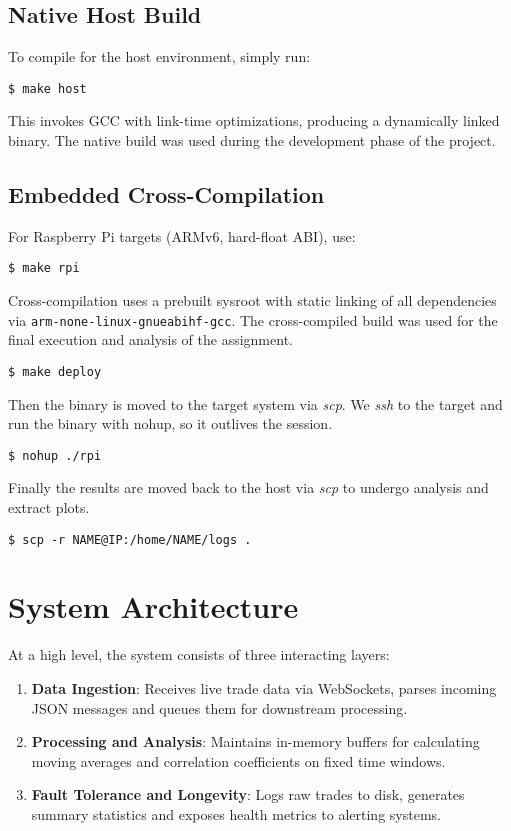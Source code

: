 \documentclass{article}
\begin{document}
\subsection{Native Host Build}
To compile for the host environment, simply run:
\begin{verbatim}
$ make host
\end{verbatim}
This invokes GCC with link-time optimizations, producing a dynamically linked binary. The native build was used during the development phase of the project.

\subsection{Embedded Cross-Compilation}
For Raspberry Pi targets (ARMv6, hard-float ABI), use:
\begin{verbatim}
$ make rpi
\end{verbatim}
Cross-compilation uses a prebuilt sysroot with static linking of all dependencies via \texttt{arm-none-linux-gnueabihf-gcc}. The cross-compiled build was used for the final execution and analysis of the assignment. 
\begin{verbatim}
$ make deploy
\end{verbatim}
Then the binary is moved to the target system via \textit{scp}. We \textit{ssh} to the target and run the binary with nohup, so it outlives the session.
\begin{verbatim}
$ nohup ./rpi
\end{verbatim}
Finally the results are moved back to the host via \textit{scp} to undergo analysis and extract plots.

\begin{verbatim}
$ scp -r NAME@IP:/home/NAME/logs .
\end{verbatim}

\section{System Architecture}
At a high level, the system consists of three interacting layers:
\begin{enumerate}
  \item \textbf{Data Ingestion}: Receives live trade data via WebSockets, parses incoming JSON messages and queues them for downstream processing.
  \item \textbf{Processing and Analysis}: Maintains in-memory buffers for calculating moving averages and correlation coefficients on fixed time windows.
  \item \textbf{Fault Tolerance and Longevity}: Logs raw trades to disk, generates summary statistics and exposes health metrics to alerting systems.
\end{enumerate}
\end{document}
